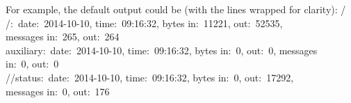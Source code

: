 For example, the default output could be (with the lines wrapped for clarity):
\outputBegin{}
/\dollarService\\
\settowidth{\utilLen}{/status}%
\hspace*{\utilLen}/\dollarService:\ \openSq{}date:\ 2014-10-10, time:\ 09:16:32,
bytes in:\ 11221, out:\ 52535,\\
\settowidth{\utilLen}{/Service/status: }%
\hspace*{\utilLen}messages in:\ 265, out:\ 264\closeSq\\
\settowidth{\utilLen}{/servi}%
\hspace*{\utilLen}auxiliary:\ \openSq{}date:\ 2014-10-10, time:\ 09:16:32, bytes in:\ 0,
out:\ 0, messages\\
\settowidth{\utilLen}{/Service/status: }%
\hspace*{\utilLen}in:\ 0, out:\ 0\closeSq\\
/\dollarService/status:\ \openSq{}date:\ 2014-10-10, time:\ 09:16:32, bytes in:\ 0,
out:\ 17292,\\
\hspace*{\utilLen}messages in:\ 0, out:\ 176\closeSq\\

